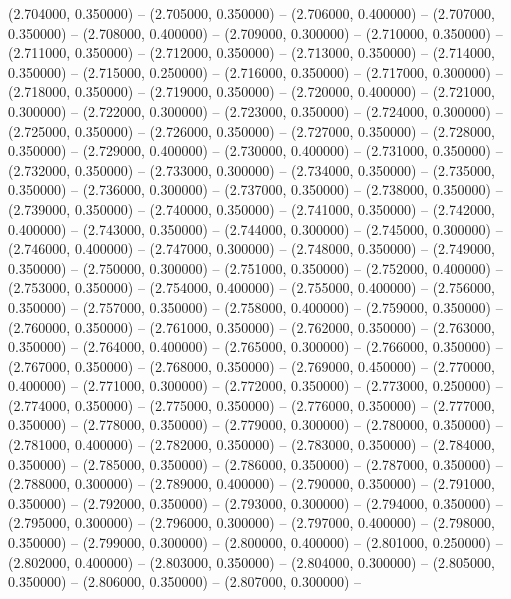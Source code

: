 (2.704000, 0.350000) -- 
(2.705000, 0.350000) -- 
(2.706000, 0.400000) -- 
(2.707000, 0.350000) -- 
(2.708000, 0.400000) -- 
(2.709000, 0.300000) -- 
(2.710000, 0.350000) -- 
(2.711000, 0.350000) -- 
(2.712000, 0.350000) -- 
(2.713000, 0.350000) -- 
(2.714000, 0.350000) -- 
(2.715000, 0.250000) -- 
(2.716000, 0.350000) -- 
(2.717000, 0.300000) -- 
(2.718000, 0.350000) -- 
(2.719000, 0.350000) -- 
(2.720000, 0.400000) -- 
(2.721000, 0.300000) -- 
(2.722000, 0.300000) -- 
(2.723000, 0.350000) -- 
(2.724000, 0.300000) -- 
(2.725000, 0.350000) -- 
(2.726000, 0.350000) -- 
(2.727000, 0.350000) -- 
(2.728000, 0.350000) -- 
(2.729000, 0.400000) -- 
(2.730000, 0.400000) -- 
(2.731000, 0.350000) -- 
(2.732000, 0.350000) -- 
(2.733000, 0.300000) -- 
(2.734000, 0.350000) -- 
(2.735000, 0.350000) -- 
(2.736000, 0.300000) -- 
(2.737000, 0.350000) -- 
(2.738000, 0.350000) -- 
(2.739000, 0.350000) -- 
(2.740000, 0.350000) -- 
(2.741000, 0.350000) -- 
(2.742000, 0.400000) -- 
(2.743000, 0.350000) -- 
(2.744000, 0.300000) -- 
(2.745000, 0.300000) -- 
(2.746000, 0.400000) -- 
(2.747000, 0.300000) -- 
(2.748000, 0.350000) -- 
(2.749000, 0.350000) -- 
(2.750000, 0.300000) -- 
(2.751000, 0.350000) -- 
(2.752000, 0.400000) -- 
(2.753000, 0.350000) -- 
(2.754000, 0.400000) -- 
(2.755000, 0.400000) -- 
(2.756000, 0.350000) -- 
(2.757000, 0.350000) -- 
(2.758000, 0.400000) -- 
(2.759000, 0.350000) -- 
(2.760000, 0.350000) -- 
(2.761000, 0.350000) -- 
(2.762000, 0.350000) -- 
(2.763000, 0.350000) -- 
(2.764000, 0.400000) -- 
(2.765000, 0.300000) -- 
(2.766000, 0.350000) -- 
(2.767000, 0.350000) -- 
(2.768000, 0.350000) -- 
(2.769000, 0.450000) -- 
(2.770000, 0.400000) -- 
(2.771000, 0.300000) -- 
(2.772000, 0.350000) -- 
(2.773000, 0.250000) -- 
(2.774000, 0.350000) -- 
(2.775000, 0.350000) -- 
(2.776000, 0.350000) -- 
(2.777000, 0.350000) -- 
(2.778000, 0.350000) -- 
(2.779000, 0.300000) -- 
(2.780000, 0.350000) -- 
(2.781000, 0.400000) -- 
(2.782000, 0.350000) -- 
(2.783000, 0.350000) -- 
(2.784000, 0.350000) -- 
(2.785000, 0.350000) -- 
(2.786000, 0.350000) -- 
(2.787000, 0.350000) -- 
(2.788000, 0.300000) -- 
(2.789000, 0.400000) -- 
(2.790000, 0.350000) -- 
(2.791000, 0.350000) -- 
(2.792000, 0.350000) -- 
(2.793000, 0.300000) -- 
(2.794000, 0.350000) -- 
(2.795000, 0.300000) -- 
(2.796000, 0.300000) -- 
(2.797000, 0.400000) -- 
(2.798000, 0.350000) -- 
(2.799000, 0.300000) -- 
(2.800000, 0.400000) -- 
(2.801000, 0.250000) -- 
(2.802000, 0.400000) -- 
(2.803000, 0.350000) -- 
(2.804000, 0.300000) -- 
(2.805000, 0.350000) -- 
(2.806000, 0.350000) -- 
(2.807000, 0.300000) -- 
